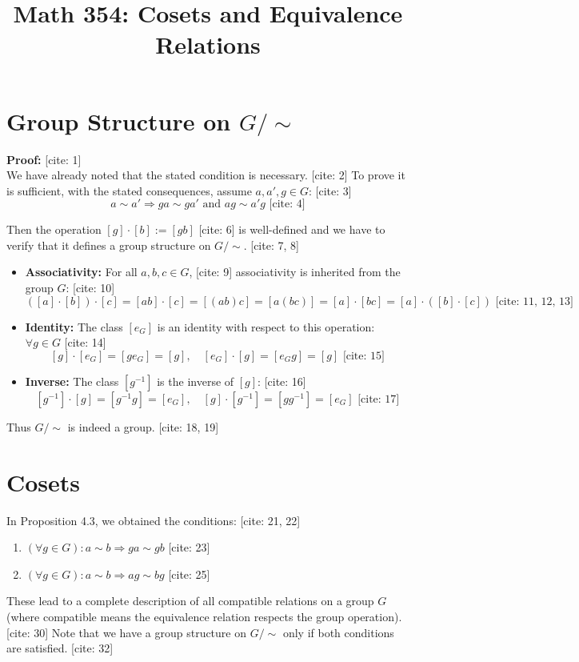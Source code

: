 

\title{Math 354: Cosets and Equivalence Relations}
\date{}

\maketitle

\section{Group Structure on $G/\sim$}

\textbf{Proof:} [cite: 1] \\
We have already noted that the stated condition is necessary. [cite: 2] To prove it is sufficient, with the stated consequences, assume $a, a', g \in G$: [cite: 3]
\begin{equation*}
    a \sim a' \Rightarrow ga \sim ga' \text{ and } ag \sim a'g \text{ [cite: 4]}
\end{equation*}

Then the operation $[g] \cdot [b] := [gb]$ [cite: 6] is well-defined and we have to verify that it defines a group structure on $G/\sim$. [cite: 7, 8]

\begin{itemize}
    \item \textbf{Associativity:} For all $a, b, c \in G$, [cite: 9] associativity is inherited from the group $G$: [cite: 10]
    \[ ([a] \cdot [b]) \cdot [c] = [ab] \cdot [c] = [(ab)c] = [a(bc)] = [a] \cdot [bc] = [a] \cdot ([b] \cdot [c]) \text{ [cite: 11, 12, 13]} \]
    \item \textbf{Identity:} The class $[e_G]$ is an identity with respect to this operation: $\forall g \in G$ [cite: 14]
    \[ [g] \cdot [e_G] = [ge_G] = [g], \quad [e_G] \cdot [g] = [e_Gg] = [g] \text{ [cite: 15]} \]
    \item \textbf{Inverse:} The class $[g^{-1}]$ is the inverse of $[g]$: [cite: 16]
    \[ [g^{-1}] \cdot [g] = [g^{-1}g] = [e_G], \quad [g] \cdot [g^{-1}] = [gg^{-1}] = [e_G] \text{ [cite: 17]} \]
\end{itemize}
Thus $G/\sim$ is indeed a group. [cite: 18, 19]

\section{Cosets}

In Proposition 4.3, we obtained the conditions: [cite: 21, 22]
\begin{enumerate}
    \item[(*)] $(\forall g \in G): a \sim b \Rightarrow ga \sim gb$ [cite: 23]
    \item[(**)] $(\forall g \in G): a \sim b \Rightarrow ag \sim bg$ [cite: 25]
\end{enumerate}
These lead to a complete description of all compatible relations on a group $G$ (where compatible means the equivalence relation respects the group operation). [cite: 30] Note that we have a group structure on $G/\sim$ only if both conditions are satisfied. [cite: 32]

